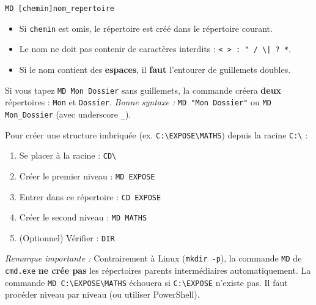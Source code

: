 \documentclass[11pt]{article}
\begin{document}
\begin{propriete}
\texttt{MD [chemin]nom\_repertoire}
\begin{itemize}
    \item Si \texttt{chemin} est omis, le répertoire est créé dans le répertoire courant.
    \item Le nom ne doit pas contenir de caractères interdits : \texttt{< > : " / \textbackslash | ? *}.
    \item Si le nom contient des \textbf{espaces}, il \textbf{faut} l'entourer de guillemets doubles.
\end{itemize}
\end{propriete}

\begin{attention}
Si vous tapez \texttt{MD Mon Dossier} sans guillemets, la commande créera \textbf{deux} répertoires : \texttt{Mon} et \texttt{Dossier}.
\emph{Bonne syntaxe :} \texttt{MD "Mon Dossier"} ou \texttt{MD Mon\_Dossier} (avec underscore \texttt{\_}).
\end{attention}

\begin{methode}
Pour créer une structure imbriquée (ex. \texttt{C:\textbackslash EXPOSE\textbackslash MATHS}) depuis la racine \texttt{C:\textbackslash} :
\begin{enumerate}
    \item Se placer à la racine : \texttt{CD\textbackslash}
    \item Créer le premier niveau : \texttt{MD EXPOSE}
    \item Entrer dans ce répertoire : \texttt{CD EXPOSE}
    \item Créer le second niveau : \texttt{MD MATHS}
    \item (Optionnel) Vérifier : \texttt{DIR}
\end{enumerate}
\emph{Remarque importante :} Contrairement à Linux (\texttt{mkdir -p}), la commande \texttt{MD} de \texttt{cmd.exe} \textbf{ne crée pas} les répertoires parents intermédiaires automatiquement. La commande \texttt{MD C:\textbackslash EXPOSE\textbackslash MATHS} échouera si \texttt{C:\textbackslash EXPOSE} n'existe pas. Il faut procéder niveau par niveau (ou utiliser PowerShell).
\end{methode}
\end{document}
